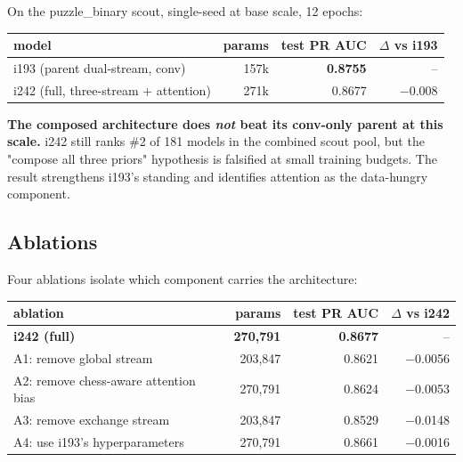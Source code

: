 \documentclass[10pt,a4paper]{article}
\begin{document}
\begin{tcolorbox}[callout, title=Result --- i242 vs i193]
On the puzzle\_binary scout, single-seed at base scale, 12 epochs:

\begin{footnotesize}
\begin{tabularx}{\linewidth}{@{}L r r r@{}}
\toprule
\textbf{model} & \textbf{params} & \textbf{test PR AUC} & \textbf{$\Delta$ vs i193} \\
\midrule
i193 (parent dual-stream, conv) & 157k & \textbf{0.8755} & -- \\
i242 (full, three-stream + attention) & 271k & 0.8677 & $-0.008$ \\
\bottomrule
\end{tabularx}
\end{footnotesize}

\textbf{The composed architecture does \emph{not} beat its conv-only parent
at this scale.} i242 still ranks \#2 of 181 models in the combined scout
pool, but the "compose all three priors" hypothesis is falsified at small
training budgets. The result strengthens i193's standing and identifies
attention as the data-hungry component.
\end{tcolorbox}

\subsection{Ablations}

Four ablations isolate which component carries the architecture:

\begin{footnotesize}
\begin{tabularx}{\linewidth}{@{}L r r r@{}}
\toprule
\textbf{ablation} & \textbf{params} & \textbf{test PR AUC} & \textbf{$\Delta$ vs i242} \\
\midrule
\textbf{i242 (full)} & \textbf{270,791} & \textbf{0.8677} & -- \\
A1: remove global stream & 203,847 & 0.8621 & $-$0.0056 \\
A2: remove chess-aware attention bias & 270,791 & 0.8624 & $-$0.0053 \\
A3: remove exchange stream & 203,847 & 0.8529 & $-$0.0148 \\
A4: use i193's hyperparameters & 270,791 & 0.8661 & $-$0.0016 \\
\bottomrule
\end{tabularx}
\end{footnotesize}
\end{document}
